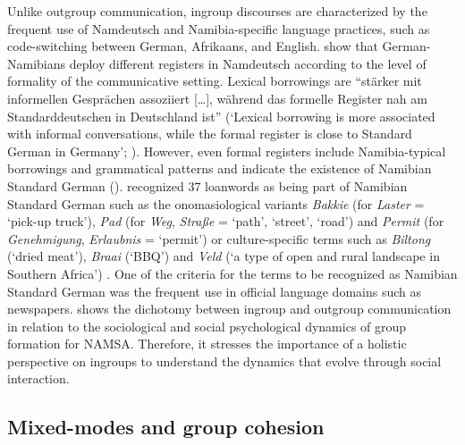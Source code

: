 \documentclass[output=paper]{langsci/langscibook}
\begin{document}
Unlike outgroup communication, ingroup discourses are characterized by the frequent use of Namdeutsch and Namibia-specific language practices, such as code-switching between German, Afrikaans, and English. \citet{wiese_registerdifferenzierung_2021} show that German-Namibians deploy different registers in Namdeutsch according to the level of formality of the communicative setting. Lexical borrowings are “stärker mit informellen Gesprächen assoziiert […], während das formelle Register nah am Standarddeutschen in Deutschland ist” (‘Lexical borrowing is more associated with informal conversations, while the formal register is close to Standard German in Germany’; \citealt[290]{wiese_registerdifferenzierung_2021}). However, even formal registers include Namibia-typical borrowings and grammatical patterns and indicate the existence of Namibian Standard German (\citealt{wiese_registerdifferenzierung_2021}). \citet{ammon_variantenworterbuch_2016} recognized 37 loanwords as being part of Namibian Standard German such as the onomasiological variants \textit{Bakkie} (for \textit{Laster} = ‘pick-up truck’), \textit{Pad} (for \textit{Weg}, \textit{Straße} = ‘path’, ‘street’, ‘road’) and \textit{Permit} (for \textit{Genehmigung}, \textit{Erlaubnis} = ‘permit’) or culture-specific terms such as \textit{Biltong} (‘dried meat’), \textit{Braai} (‘BBQ’) and \textit{Veld} (‘a type of open and rural landscape in Southern Africa’) \citep[206--207]{hausler_zur_2017}. One of the criteria for the terms to be recognized as Namibian Standard German was the frequent use in official language domains such as newspapers.  shows the dichotomy between ingroup and outgroup communication in relation to the sociological and social psychological dynamics of group formation for NAMSA. Therefore, it stresses the importance of a holistic perspective on ingroups to understand the dynamics that evolve through social interaction.
  

 
   
\subsection{Mixed-modes and group cohesion}
 \label{sec:radke:3.3}
 
\end{document}
